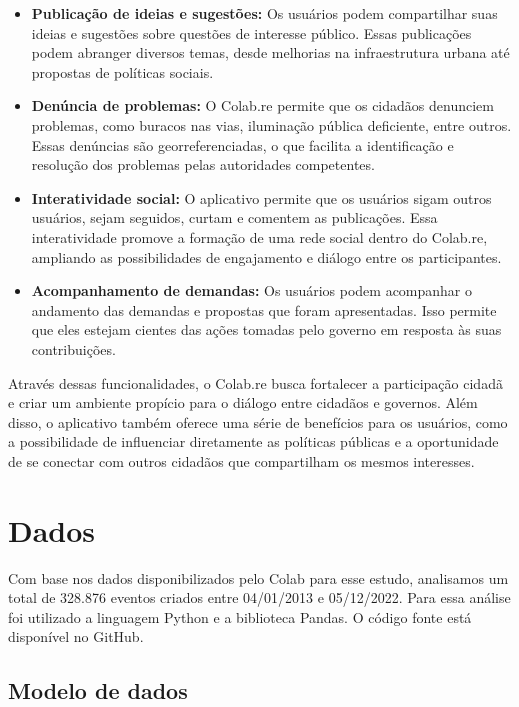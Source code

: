 \begin{itemize}
  \item \textbf{Publicação de ideias e sugestões:} Os usuários podem compartilhar suas ideias e sugestões sobre questões de interesse público. Essas publicações podem abranger diversos temas, desde melhorias na infraestrutura urbana até propostas de políticas sociais.

  \item \textbf{Denúncia de problemas:} O Colab.re permite que os cidadãos denunciem problemas, como buracos nas vias, iluminação pública deficiente, entre outros. Essas denúncias são georreferenciadas, o que facilita a identificação e resolução dos problemas pelas autoridades competentes.

  \item \textbf{Interatividade social:} O aplicativo permite que os usuários sigam outros usuários, sejam seguidos, curtam e comentem as publicações. Essa interatividade promove a formação de uma rede social dentro do Colab.re, ampliando as possibilidades de engajamento e diálogo entre os participantes.

  \item \textbf{Acompanhamento de demandas:} Os usuários podem acompanhar o andamento das demandas e propostas que foram apresentadas. Isso permite que eles estejam cientes das ações tomadas pelo governo em resposta às suas contribuições.
\end{itemize}

Através dessas funcionalidades, o Colab.re busca fortalecer a participação cidadã e criar um ambiente propício para o diálogo entre cidadãos e governos. Além disso, o aplicativo também oferece uma série de benefícios para os usuários, como a possibilidade de influenciar diretamente as políticas públicas e a oportunidade de se conectar com outros cidadãos que compartilham os mesmos interesses.

\section{Dados}

Com base nos dados disponibilizados pelo Colab para esse estudo, analisamos um total de 328.876 eventos criados entre 04/01/2013 e 05/12/2022. Para essa análise foi utilizado a linguagem Python e a biblioteca Pandas. O código fonte está disponível no GitHub.

\subsection*{Modelo de dados}

